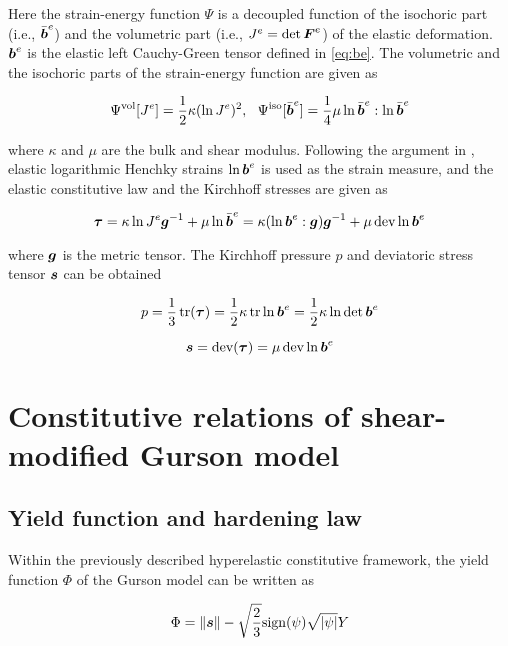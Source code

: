 Here the strain-energy function $\Psi$ is a decoupled function of the isochoric part (i.e., $\bar{{\boldsymbol{b}}}^e$) and the volumetric part (i.e., $J^e=\det{\boldsymbol{F}}^e$) of the elastic deformation. ${\boldsymbol{b}}^e$ is the elastic left Cauchy-Green tensor defined in \eqref{eq:be}. The volumetric and the isochoric parts of the strain-energy function are given as

\begin{equation}
\Psi^{\rm vol}[J^e] =\frac{1}{2}\kappa(\ln J^e)^2,~~\Psi^{\rm iso}[\bar{{\boldsymbol{b}}}^e] = \frac{1}{4}\mu\ln\bar{{\boldsymbol{b}}}^e:\ln\bar{{\boldsymbol{b}}}^e
\end{equation}

where $\kappa$ and $\mu$ are the bulk and shear modulus. Following the argument in \cite{Steinmann1994}, elastic logarithmic Henchky strains $\ln{\boldsymbol{b}}^e$ is used as the strain measure, and the elastic constitutive law and the Kirchhoff stresses are given as

\begin{equation}\label{eq:Kirchhoff}
{\boldsymbol{\tau}}=\kappa\ln J^e{\boldsymbol{g}}^{-1} + \mu\ln\bar{{\boldsymbol{b}}}^e = \kappa(\ln{\boldsymbol{b}}^e:{\boldsymbol{g}}){\boldsymbol{g}}^{-1} + \mu\operatorname{\text{dev}}\ln{\boldsymbol{b}}^e
\end{equation}

where ${\boldsymbol{g}}$ is the metric tensor. The Kirchhoff pressure $p$ and deviatoric stress tensor ${\boldsymbol{s}}$ can be obtained

\begin{equation}\label{eq:p}
p = \frac{1}{3}\operatorname{\text{tr}}({\boldsymbol{\tau}}) = \frac{1}{2}\kappa\operatorname{\text{tr}}\ln{\boldsymbol{b}}^e = \frac{1}{2}\kappa\ln\det{\boldsymbol{b}}^e
\end{equation}

\begin{equation}\label{eq:s}
{\boldsymbol{s}} = \operatorname{\text{dev}}({\boldsymbol{\tau}}) = \mu\operatorname{\text{dev}}\ln{\boldsymbol{b}}^e
\end{equation}

\section{Constitutive relations of shear-modified Gurson model}

\subsection{Yield function and hardening law}
Within the previously described hyperelastic constitutive framework, the yield function $\Phi$ of the Gurson model can be written as

\begin{equation}\label{eq:Phi}
\Phi = \|{\boldsymbol{s}}\| - \sqrt{\frac{2}{3}}{\rm sign}(\psi)\sqrt{|\psi|} Y
\end{equation}

